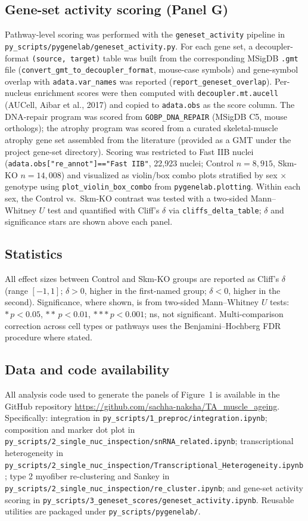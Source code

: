\subsection*{Gene-set activity scoring (Panel G)}
Pathway-level scoring was performed with the \texttt{geneset\_activity} pipeline in \texttt{py\_scripts/pygenelab/geneset\_activity.py}. For each gene set, a decoupler-format \texttt{(source, target)} table was built from the corresponding MSigDB \texttt{.gmt} file (\texttt{convert\_gmt\_to\_decoupler\_format}, mouse-case symbols) and gene-symbol overlap with \texttt{adata.var\_names} was reported (\texttt{report\_geneset\_overlap}). Per-nucleus enrichment scores were then computed with \texttt{decoupler.mt.aucell} (AUCell, Aibar et al., 2017) and copied to \texttt{adata.obs} as the score column. The DNA-repair program was scored from \texttt{GOBP\_DNA\_REPAIR} (MSigDB C5, mouse orthologs); the atrophy program was scored from a curated skeletal-muscle atrophy gene set assembled from the literature (provided as a GMT under the project gene-set directory). Scoring was restricted to Fast IIB nuclei (\texttt{adata.obs["re\_annot"]=="Fast IIB"}, 22{,}923 nuclei; Control $n=8{,}915$, Skm-KO $n=14{,}008$) and visualized as violin/box combo plots stratified by sex $\times$ genotype using \texttt{plot\_violin\_box\_combo} from \texttt{pygenelab.plotting}. Within each sex, the Control vs.\ Skm-KO contrast was tested with a two-sided Mann--Whitney $U$ test and quantified with Cliff's $\delta$ via \texttt{cliffs\_delta\_table}; $\delta$ and significance stars are shown above each panel.

\subsection*{Statistics}
All effect sizes between Control and Skm-KO groups are reported as Cliff's $\delta$ (range $[-1,1]$; $\delta>0$, higher in the first-named group; $\delta<0$, higher in the second). Significance, where shown, is from two-sided Mann--Whitney $U$ tests: $* \, p<0.05$, $** \, p<0.01$, $*** \, p<0.001$; ns, not significant. Multi-comparison correction across cell types or pathways uses the Benjamini--Hochberg FDR procedure where stated.

\subsection*{Data and code availability}
All analysis code used to generate the panels of Figure~1 is available in the GitHub repository \url{https://github.com/sachha-naksha/TA_muscle_ageing}. Specifically: integration in \texttt{py\_scripts/1\_preproc/integration.ipynb}; composition and marker dot plot in \texttt{py\_scripts/2\_single\_nuc\_inspection/snRNA\_related.ipynb}; transcriptional heterogeneity in \texttt{py\_scripts/2\_single\_nuc\_inspection/Transcriptional\_Heterogeneity.ipynb}; type 2 myofiber re-clustering and Sankey in \texttt{py\_scripts/2\_single\_nuc\_inspection/re\_cluster.ipynb}; and gene-set activity scoring in \texttt{py\_scripts/3\_geneset\_scores/geneset\_activity.ipynb}. Reusable utilities are packaged under \texttt{py\_scripts/pygenelab/}.
